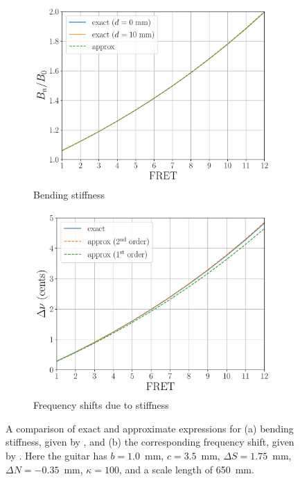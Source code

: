 \begin{figure}
  \centering
  \begin{subfigure}[b]{0.8\textwidth}
      \centering
      \includegraphics[width=5.0in]{../figures/bn_test}
      \caption{Bending stiffness}
      \label{fig:bn_test}
  \end{subfigure}
  \par\vspace{0.25in}
  \begin{subfigure}[b]{0.8\textwidth}
      \centering
      \includegraphics[width=5.0in]{../figures/bnu_test}
      \caption{Frequency shifts due to stiffness}
      \label{fig:bnu_test}
  \end{subfigure}
  \caption{\label{fig:stiffness_test} A comparison of exact and approximate expressions for (a) bending stiffness, given by , and (b) the corresponding frequency shift, given by . Here the guitar has $b = 1.0$~mm, $c = 3.5$~mm, $\Delta S = 1.75$~mm, $\Delta N = -0.35$~mm, $\kappa = 100$, and a scale length of 650~mm.}
\end{figure}

